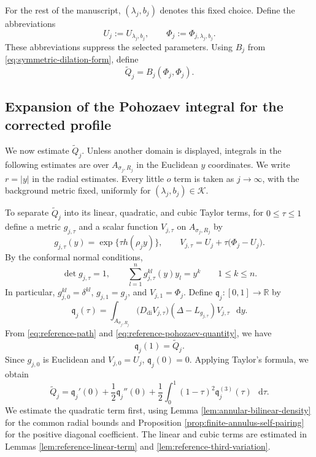\documentclass[11pt]{article}
\numberwithin{equation}{section}
\theoremstyle{remark}
\newcommand{\R}{\mathbb R}
\newcommand{\dd}{\mathop{}\!\mathrm{d}}
\begin{document}
For the rest of the manuscript, \((\lambda_j,b_j)\) denotes this fixed
choice.  Define the abbreviations
\[
 U_j:=U_{\lambda_j,b_j},
 \qquad
 \Phi_j:=\Phi_{j,\lambda_j,b_j}.
\]
These abbreviations suppress the selected parameters. Using
 \( B_j\) from \eqref{eq:symmetric-dilation-form}, define
 {
\begin{equation}\label{eq:reference-pohozaev-quantity}
 \widetilde Q_j
 = B_j(\Phi_j,\Phi_j).
\end{equation}
}

\subsection{Expansion of the Pohozaev integral for the corrected profile}

We now estimate \(\widetilde Q_j\).
Unless another domain is displayed, integrals in the following estimates
are over \(A_{\sigma_j,R_j}\) in the Euclidean \(y\) coordinates.
We write \(r=|y|\) in the radial estimates. Every little \(o\) term is
taken as \(j\to\infty\), with the background metric fixed, uniformly for
\((\lambda_j,b_j)\in\mathcal K\).

To separate \(\widetilde Q_j\) into its linear, quadratic, and cubic Taylor terms, for \(0\le\tau\le1\) define a metric \(g_{j,\tau}\) and a scalar function
\(V_{j,\tau}\) on \(A_{\sigma_j,R_j}\) by
\begin{equation}\label{eq:reference-path}
 g_{j,\tau}(y)=\exp\{\tau h(\rho_jy)\},\qquad
 V_{j,\tau}=U_j
 +\tau\bigl(\Phi_j-U_j\bigr).
\end{equation}
{By the conformal normal conditions,}
\[
 \det g_{j,\tau}=1,\qquad
 \sum_{l=1}^ng_{j,\tau}^{kl}(y)y_l=y^k
 \qquad 1\le k\le n.
\]
In particular, \(g_{j,0}^{kl}=\delta^{kl}\), \(g_{j,1}=g_j\), and
\(V_{j,1}=\Phi_j\). {Define
\(\mathfrak q_j:[0,1]\to\R\) by}
\begin{equation}\label{eq:reference-pohozaev-path}
 \mathfrak q_j(\tau)=\int_{A_{\sigma_j,R_j}}
 \bigl(D_{\mathrm{di}}V_{j,\tau}\bigr)
 (\Delta-L_{g_{j,\tau}})V_{j,\tau}\,\dd y.
\end{equation}
{From \eqref{eq:reference-path} and
\eqref{eq:reference-pohozaev-quantity}, we have}
\[
 \mathfrak q_j(1)=\widetilde Q_j.
\]
Since \(g_{j,0}\) is Euclidean and \(V_{j,0}=U_j\),
\(\mathfrak q_j(0)=0\). {Applying Taylor's formula, we obtain}
\begin{equation}\label{eq:reference-pohozaev-taylor-formula}
 \widetilde Q_j=\mathfrak q_j'(0)+\frac12\mathfrak q_j''(0)
 +\frac12\int_0^1(1-\tau)^2\mathfrak q_j^{(3)}(\tau)\,\dd\tau.
\end{equation}
{We estimate the quadratic term first, using
Lemma  \ref{lem:annular-bilinear-density} for the common radial bounds and
Proposition  \ref{prop:finite-annulus-self-pairing} for the positive diagonal
coefficient. The linear and cubic terms are estimated in
Lemmas  \ref{lem:reference-linear-term} and
\ref{lem:reference-third-variation}.}
\end{document}
